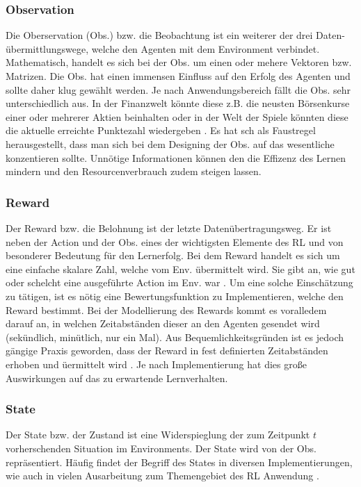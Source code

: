 \subsubsection{Observation}\label{sec:Observation}
Die Oberservation (Obs.) bzw. die Beobachtung ist ein weiterer der drei Daten-übermittlungswege, welche den Agenten mit dem Environment verbindet. Mathematisch, handelt es sich bei der Obs. um einen oder mehere Vektoren bzw. Matrizen. Die Obs. hat einen immensen Einfluss auf den Erfolg des Agenten und sollte daher klug gewählt werden.
Je nach Anwendungsbereich fällt die Obs. sehr unterschiedlich aus. In der Finanzwelt könnte diese z.B. die neusten Börsenkurse einer oder mehrerer Aktien beinhalten oder in der Welt der Spiele könnten diese die aktuelle erreichte Punktezahl wiedergeben \cite{DRL}. 
Es hat sch als Faustregel herausgestellt, dass man sich bei dem Designing der Obs. auf das wesentliche konzentieren sollte. Unnötige Informationen können den die Effizenz des Lernen mindern und den Resourcenverbrauch zudem steigen lassen.

\subsubsection{Reward}\label{sec:Reward}
Der Reward bzw. die Belohnung ist der letzte Datenübertragungsweg. Er ist neben der Action und der Obs. eines der wichtigsten Elemente des RL und von besonderer Bedeutung für den Lernerfolg.
Bei dem Reward handelt es sich um eine einfache skalare Zahl, welche vom Env. übermittelt wird. Sie gibt an, wie gut oder schelcht eine ausgeführte Action im Env. war \cite{DRL}. Um eine solche Einschätzung zu tätigen, ist es nötig eine Bewertungsfunktion zu Implementieren, welche den Reward bestimmt. 
Bei der Modellierung des Rewards kommt es voralledem darauf an, in welchen Zeitabständen dieser an den Agenten gesendet wird (sekündlich, minütlich, nur ein Mal). Aus Bequemlichkeitsgründen ist es jedoch gängige Praxis geworden, dass der Reward in fest definierten Zeitabständen erhoben und üermittelt wird \cite{DRL}.
Je nach Implementierung hat dies große Auswirkungen auf das zu erwartende Lernverhalten.

\subsubsection{State}\label{sec:State}
Der State bzw. der Zustand ist eine Widerspieglung der zum Zeitpunkt $t$ vorherschenden Situation im Environments. 
Der State wird von der Obs. repräsentiert. Häufig findet der Begriff des States in diversen Implementierungen, wie auch in vielen Ausarbeitung zum Themengebiet des RL Anwendung \cite{Sutton1998}.

